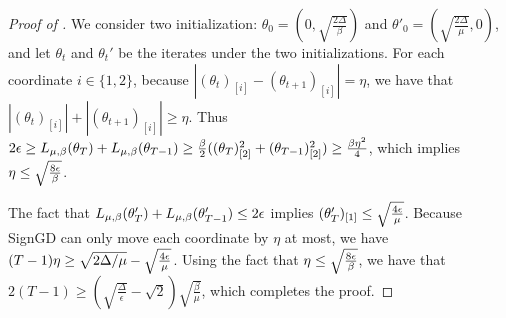\begin{proof}[Proof of ]
    We consider two initialization: $\theta_0 = (0,\sqrt{\frac{2\Delta}{\beta}})$ and $\theta'_0 = (\sqrt{\frac{2\Delta}{\mu}},0)$, and let $\theta_t$ and $\theta_t'$ be the iterates under the two initializations. For each coordinate $i\in\{1,2\}$, because $|(\theta_t)_{[i]}- (\theta_{t+1})_{[i]}|=\eta$, we have that $|(\theta_t)_{[i]}| + |(\theta_{t+1})_{[i]}|\ge \eta$. Thus $2\epsilon\ge L_{\mu,\beta}(\theta_T)+ L_{\mu,\beta}(\theta_{T-1}) \ge \frac{\beta}{2}((\theta_T)_{[2]}^2 + (\theta_{T-1})_{[2]}^2)\ge \frac{\beta\eta^2}{4}$, which implies $\eta \le \sqrt{\frac{8\epsilon}{\beta}}$.

    The fact that $L_{\mu,\beta}(\theta_T')+ L_{\mu,\beta}(\theta_{T-1}')\le 2\epsilon$ implies $(\theta_{T}')_{[1]}\le \sqrt{\frac{4\epsilon}{\mu}}$. Because SignGD can only move each coordinate by $\eta$ at most, we have $(T-1)\eta\ge \sqrt{2\Delta/\mu} - \sqrt{\frac{4\epsilon}{\mu}}$. Using the fact that $\eta \le \sqrt{\frac{8\epsilon}{\beta}}$, we have that $2(T-1)\ge (\sqrt{\frac{\Delta}{\epsilon}}-\sqrt{2})\sqrt{\frac{\beta}{\mu}}$, which completes the proof.
\end{proof}
